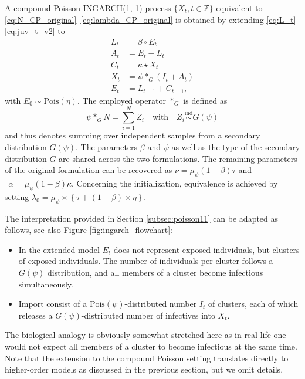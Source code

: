 \documentclass{article}
\begin{document}
A compound Poisson INGARCH(1, 1) process $\{X_t, t \in \mathbb{Z}\}$ equivalent to \eqref{eq:N_CP_original}--\eqref{eq:lambda_CP_original} is obtained by extending \eqref{eq:L_t}--\eqref{eq:juv_t_v2} to
\begin{align}
L_t & = \beta \circ E_t \label{eq:L_t_CP}\\
A_t & = E_t - L_t \label{eq:A_t_CP}\\
C_t & = \kappa \star X_t \label{eq:C_t_CP}\\
X_t & = \psi *_G (I_t + A_t)\label{eq:X_t_CP} \\
E_t & = L_{t - 1} + C_{t - 1},\label{eq:juv_t_CP}
\end{align}
with $E_0 \sim \text{Pois}(\eta)$. The employed operator $*_G$ is defined as
$$
\psi *_G N = \sum_{i = 1}^N Z_i \ \ \ \text{ with } \ \ \ Z_i \stackrel{\text{ind}}{\sim} G(\psi)
$$
and thus denotes summing over independent samples from a secondary distribution $G(\psi)$. The parameters $\beta$ and $\psi$ as well as the type of the secondary distribution $G$ are shared across the two formulations. The remaining parameters of the original formulation can be recovered as
$
\nu = \mu_\psi(1 - \beta)\tau$ and $ \ \
\alpha = \mu_\psi(1 - \beta)\kappa.
$
Concerning the initialization, equivalence is achieved by setting $\lambda_0 = \mu_\psi\times \left\{\tau + (1 - \beta) \times \eta\right\}$.

The interpretation provided in Section \ref{subsec:poisson11} can be adapted as follows, see also Figure \ref{fig:ingarch_flowchart}:
\begin{itemize}
\item In the extended model $E_t$ does not represent exposed individuals, but clusters of exposed individuals. The number of individuals per cluster follows a $G(\psi)$ distribution, and all members of a cluster become infectious simultaneously.
\item Import consist of a $\text{Pois}(\psi)$-distributed number $I_t$ of clusters, each of which releases a $G(\psi)$-distributed number of infectives into $X_t$.
\end{itemize}
The biological analogy is obviously somewhat stretched here as in real life one would not expect all members of a cluster to become infectious at the same time. Note that the extension to the compound Poisson setting translates directly to higher-order models as discussed in the previous section, but we omit details.
\end{document}
